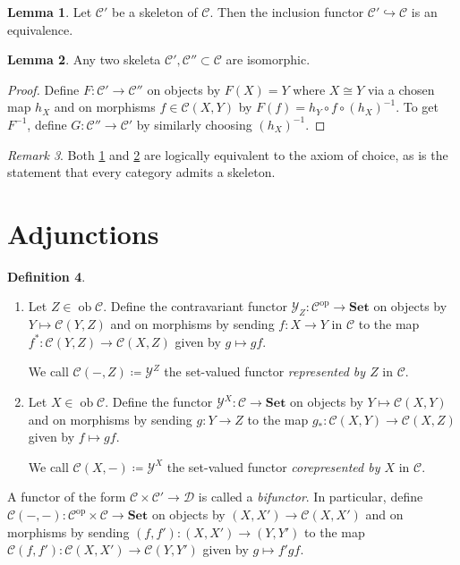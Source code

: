 \documentclass[10pt,letterpaper,cm]{nupset}
\theoremstyle{definition}
\newtheorem{definition}{Definition}[section]
\theoremstyle{theorem}
\newtheorem{lemma}[definition]{Lemma}
\theoremstyle{remark}
\newtheorem{remark}[definition]{Remark}
\newcommand{\1}{\mathbf{1}}
\renewcommand{\c}{\mathscr{C}}
\renewcommand{\d}{\mathscr{D}}
\newcommand{\y}{\mathscr{Y}}
\newcommand{\0}{\vec 0}
\DeclareMathOperator{\op}{op}
\DeclareMathOperator{\ob}{ob}
\begin{document}
\begin{lemma}\label{e1}
Let $\c'$ be a skeleton of $\c$. Then the inclusion functor  $\c' \hookrightarrow \c$ is an equivalence.
\end{lemma}

\smallskip

\begin{lemma}\label{e2}
Any two skeleta $\c', \c'' \subset \c$ are isomorphic.
\end{lemma}
\begin{proof}
Define $F: \c' \to \c''$ on objects by $F(X) =Y$ where $X\cong Y$ via a chosen map $h_X$ and on morphisms $f\in \c(X, Y)$ by $F(f) = h_Y \circ f \circ (h_X)^{{-1}}$.
To get $F^{{-1}}$,  define $G: \c'' \to \c'$ by similarly choosing $\left(h_X\right)^{{-1}}$.
\end{proof}

\begin{remark}
Both \cref{e1} and \cref{e2} are logically equivalent to the axiom of choice, as is the statement that every category admits a skeleton.
\end{remark}


\section{Adjunctions}

\begin{definition} $ $
\begin{enumerate}
\item Let $Z \in \ob \c$. Define the contravariant functor $\y_Z: \c^{\op} \to \mathbf{Set}$  on objects by $Y \mapsto \c(Y, Z)$ and on morphisms by sending $f: X \to Y$ in $\c$ to the map $f^{\ast} : \c(Y, Z) \to \c(X, Z)$ given by $g\mapsto gf$. 

We call $\c(-, Z)\coloneqq \y^Z$ the set-valued functor \textit{represented by $Z$} in $\c$.
\item Let $X \in \ob \c$. Define the functor $\y^X : \c \to \mathbf{Set}$ on objects by $Y \mapsto \c(X, Y)$  and on morphisms by sending $g: Y \to Z$ to the map $g_{\ast} : \c(X, Y) \to \c(X, Z)$ given by $f \mapsto gf$. 

We call $\c(X, -)\coloneqq\y^X$ the set-valued functor \textit{corepresented by $X$} in $\c$.
\end{enumerate}
\end{definition}

\smallskip

A functor of the form $\c \times \c' \to \d$ is called a \textit{bifunctor}.
In particular, define $\c(-, -): \c^{\op} \times \c \to \mathbf{Set}$ on objects by $\left(X, X'\right) \to \c(X, X')$ and on morphisms by sending $\left(f, f'\right) : (X, X') \to (Y, Y')$ to the map $\c(f, f') : \c(X, X') \to \c(Y, Y')$ given by $g \mapsto {f'}{g}{f}$.
\end{document}
